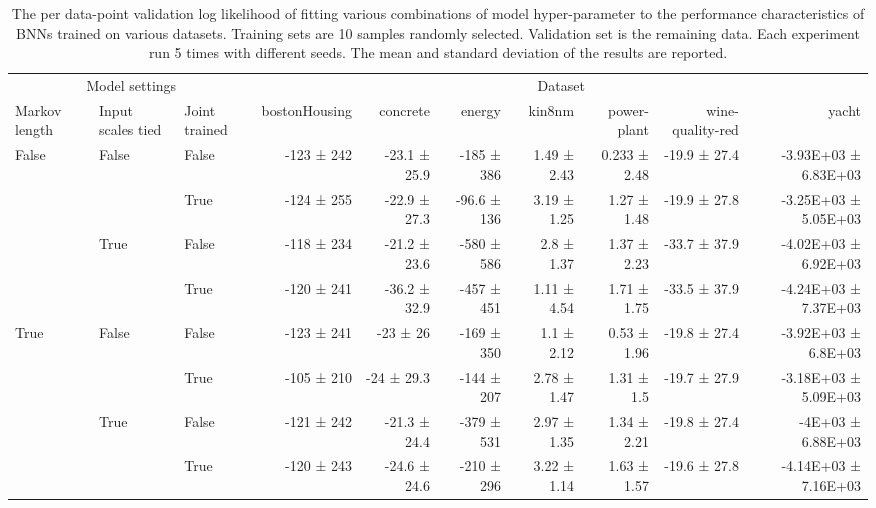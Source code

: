 {\begin{landscape}
		\begin{table}		
			\scriptsize
			\begin{tabular}{lll|rrrrrrr}
				\toprule
				\multicolumn{3}{c}{Model settings} & \multicolumn{7}{c}{Dataset} \\
				Markov length & Input scales tied & Joint trained & bostonHousing & concrete & energy & kin8nm & power-plant & wine-quality-red &   yacht \\
				\midrule
				\multirow{4}{*}{False} & \multirow{2}{*}{False} & False &               -123 ± 242 &  -23.1 ± 25.9 &   -185 ± 386 &  1.49 ± 2.43 &  0.233 ± 2.48 &     -19.9 ± 27.4 &  -3.93E+03 ± 6.83E+03 \\
				&       & True  &               -124 ± 255 &  -22.9 ± 27.3 &  -96.6 ± 136 &  3.19 ± 1.25 &   1.27 ± 1.48 &     -19.9 ± 27.8 &  -3.25E+03 ± 5.05E+03 \\
				\cline{2-10}
				& \multirow{2}{*}{True} & False &               -118 ± 234 &  -21.2 ± 23.6 &   -580 ± 586 &   2.8 ± 1.37 &   1.37 ± 2.23 &     -33.7 ± 37.9 &  -4.02E+03 ± 6.92E+03 \\
				&       & True  &               -120 ± 241 &  -36.2 ± 32.9 &   -457 ± 451 &  1.11 ± 4.54 &   1.71 ± 1.75 &     -33.5 ± 37.9 &  -4.24E+03 ± 7.37E+03 \\
				\cline{1-10}
				\cline{2-10}
				\multirow{4}{*}{True} & \multirow{2}{*}{False} & False &               -123 ± 241 &      -23 ± 26 &   -169 ± 350 &   1.1 ± 2.12 &   0.53 ± 1.96 &     -19.8 ± 27.4 &   -3.92E+03 ± 6.8E+03 \\
				&       & True  &               -105 ± 210 &    -24 ± 29.3 &   -144 ± 207 &  2.78 ± 1.47 &    1.31 ± 1.5 &     -19.7 ± 27.9 &  -3.18E+03 ± 5.09E+03 \\
				\cline{2-10}
				& \multirow{2}{*}{True} & False &               -121 ± 242 &  -21.3 ± 24.4 &   -379 ± 531 &  2.97 ± 1.35 &   1.34 ± 2.21 &     -19.8 ± 27.4 &     -4E+03 ± 6.88E+03 \\
				&       & True  &               -120 ± 243 &  -24.6 ± 24.6 &   -210 ± 296 &  3.22 ± 1.14 &   1.63 ± 1.57 &     -19.6 ± 27.8 &  -4.14E+03 ± 7.16E+03 \\
				\bottomrule
			\end{tabular}
			\caption{The per data-point validation log likelihood of fitting various combinations of model hyper-parameter to the performance characteristics of BNNs trained on various datasets. Training sets are 10 samples randomly selected. Validation set is the remaining data. Each experiment run 5 times with different seeds. The mean and standard deviation of the results are reported.}
			\label{tbl:hyp_small}		
		\end{table}
	\end{landscape}
	\clearpage%
}

